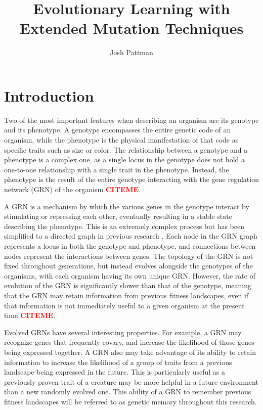 \documentclass[twocolumn,a4paper,11pt]{article}
\author{Josh Pattman}
\title{Evolutionary Learning with Extended Mutation Techniques}
\newcommand{\citeme}{\textbf{\textcolor{red}{CITEME}}}
\begin{document}
	\maketitle
    \section{Introduction}
    Two of the most important features when describing an organism are its genotype and its phenotype. A genotype encompasses the entire genetic code of an organism, while the phenotype is the physical manifestation of that code as specific traits such as size or color. The relationship between a genotype and a phenotype is a complex one, as a single locus in the genotype does not hold a one-to-one relationship with a single trait in the phenotype. Instead, the phenotype is the result of the entire genotype interacting with the gene regulation network (GRN) of the organism \citeme.

    A GRN is a mechanism by which the various genes in the genotype interact by stimulating or repressing each other, eventually resulting in a stable state describing the phenotype. This is an extremely complex process but has been simplified to a directed graph in previous research \cite{original-paper}. Each node in the GRN graph represents a locus in both the genotype and phenotype, and connections between nodes represent the interactions between genes. The topology of the GRN is not fixed throughout generations, but instead evolves alongside the genotypes of the organisms, with each organism having its own unique GRN. However, the rate of evolution of the GRN is significantly slower than that of the genotype, meaning that the GRN may retain information from previous fitness landscapes, even if that information is not immediately useful to a given organism at the present time \citeme.

    Evolved GRNs have several interesting properties. For example, a GRN may recognize genes that frequently covary, and increase the likelihood of those genes being expressed together. A GRN also may take advantage of its ability to retain information to increase the likelihood of a group of traits from a previous landscape being expressed in the future. This is particularly useful as a previously proven trait of a creature may be more helpful in a future environment than a new randomly evolved one. This ability of a GRN to remember previous fitness landscapes will be referred to as genetic memory throughout this research.
\end{document}
